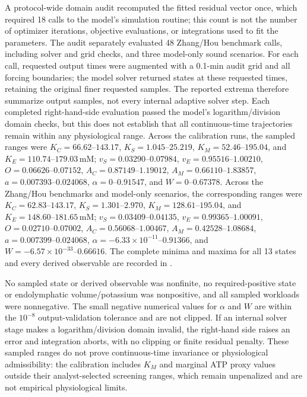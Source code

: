 \documentclass[final,5p,times]{elsarticle}
\begin{document}
A protocol-wide domain audit recomputed the fitted residual vector once, which required 18 calls to the model's simulation routine; this count is not the number of optimizer iterations, objective evaluations, or integrations used to fit the parameters. The audit separately evaluated 48 Zhang/Hou benchmark calls, including solver and grid checks, and three model-only sound scenarios. For each call, requested output times were augmented with a 0.1-min audit grid and all forcing boundaries; the model solver returned states at these requested times, retaining the original finer requested samples. The reported extrema therefore summarize output samples, not every internal adaptive solver step. Each completed right-hand-side evaluation passed the model's logarithm/division domain checks, but this does not establish that all continuous-time trajectories remain within any physiological range. Across the calibration runs, the sampled ranges were \(K_C=66.62\text{--}143.17\), \(K_S=1.045\text{--}25.219\), \(K_M=52.46\text{--}195.04\), and \(K_E=110.74\text{--}179.03\,\mathrm{mM}\); \(v_S=0.03290\text{--}0.07984\), \(v_E=0.95516\text{--}1.00210\), \(O=0.06626\text{--}0.07152\), \(A_C=0.87149\text{--}1.19012\), \(A_M=0.66110\text{--}1.83857\), \(a=0.007393\text{--}0.024068\), \(\alpha=0\text{--}0.91547\), and \(W=0\text{--}0.67378\). Across the Zhang/Hou benchmarks and model-only scenarios, the corresponding ranges were \(K_C=62.83\text{--}143.17\), \(K_S=1.301\text{--}2.970\), \(K_M=128.61\text{--}195.04\), and \(K_E=148.60\text{--}181.65\,\mathrm{mM}\); \(v_S=0.03409\text{--}0.04135\), \(v_E=0.99365\text{--}1.00091\), \(O=0.02710\text{--}0.07002\), \(A_C=0.56068\text{--}1.00467\), \(A_M=0.42528\text{--}1.08684\), \(a=0.007399\text{--}0.024068\), \(\alpha=-6.33\times10^{-11}\text{--}0.91366\), and \(W=-6.57\times10^{-33}\text{--}0.66616\). The complete minima and maxima for all 13 states and every derived observable are recorded in .

No sampled state or derived observable was nonfinite, no required-positive state or endolymphatic volume/potassium was nonpositive, and all sampled workloads were nonnegative. The small negative numerical values for \(\alpha\) and \(W\) are within the \(10^{-8}\) output-validation tolerance and are not clipped. If an internal solver stage makes a logarithm/division domain invalid, the right-hand side raises an error and integration aborts, with no clipping or finite residual penalty. These sampled ranges do not prove continuous-time invariance or physiological admissibility: the calibration includes \(K_M\) and marginal ATP proxy values outside their analyst-selected screening ranges, which remain unpenalized and are not empirical physiological limits.
\end{document}
